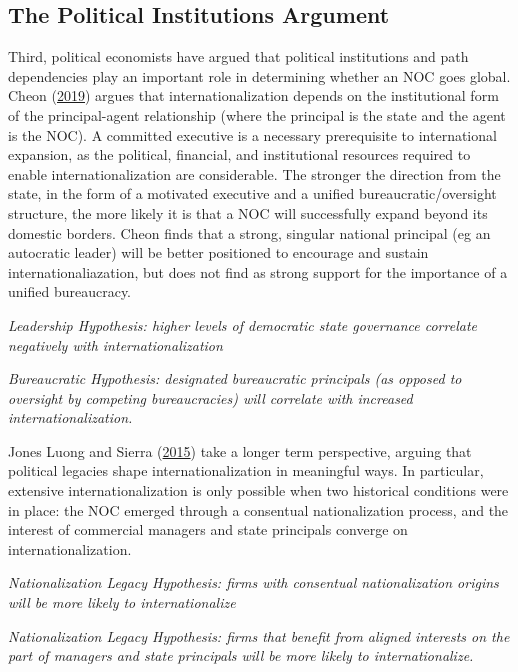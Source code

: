 \documentclass[11pt,]{book}
\begin{document}
\hypertarget{the-political-institutions-argument}{%
\subsection{The Political Institutions Argument}\label{the-political-institutions-argument}}

Third, political economists have argued that political institutions and path dependencies play an important role in determining whether an NOC goes global. Cheon (\protect\hyperlink{ref-cheon_developing_2019}{2019}) argues that internationalization depends on the institutional form of the principal-agent relationship (where the principal is the state and the agent is the NOC). A committed executive is a necessary prerequisite to international expansion, as the political, financial, and institutional resources required to enable internationalization are considerable. The stronger the direction from the state, in the form of a motivated executive and a unified bureaucratic/oversight structure, the more likely it is that a NOC will successfully expand beyond its domestic borders. Cheon finds that a strong, singular national principal (eg an autocratic leader) will be better positioned to encourage and sustain internationaliazation, but does not find as strong support for the importance of a unified bureaucracy.

\emph{Leadership Hypothesis: higher levels of democratic state governance correlate negatively with internationalization}

\emph{Bureaucratic Hypothesis: designated bureaucratic principals (as opposed to oversight by competing bureaucracies) will correlate with increased internationalization.}

Jones Luong and Sierra (\protect\hyperlink{ref-jones_luong_domestic_2015}{2015}) take a longer term perspective, arguing that political legacies shape internationalization in meaningful ways. In particular, extensive internationalization is only possible when two historical conditions were in place: the NOC emerged through a consentual nationalization process, and the interest of commercial managers and state principals converge on internationalization.

\emph{Nationalization Legacy Hypothesis: firms with consentual nationalization origins will be more likely to internationalize}

\emph{Nationalization Legacy Hypothesis: firms that benefit from aligned interests on the part of managers and state principals will be more likely to internationalize.}
\end{document}
